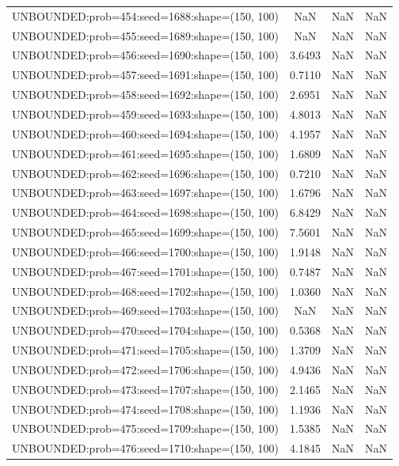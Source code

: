 \begin{longtable}{lccc}
UNBOUNDED:prob=454:seed=1688:shape=(150, 100) &     NaN &   NaN &    NaN \\
UNBOUNDED:prob=455:seed=1689:shape=(150, 100) &     NaN &   NaN &    NaN \\
UNBOUNDED:prob=456:seed=1690:shape=(150, 100) &  3.6493 &   NaN &    NaN \\
UNBOUNDED:prob=457:seed=1691:shape=(150, 100) &  0.7110 &   NaN &    NaN \\
UNBOUNDED:prob=458:seed=1692:shape=(150, 100) &  2.6951 &   NaN &    NaN \\
UNBOUNDED:prob=459:seed=1693:shape=(150, 100) &  4.8013 &   NaN &    NaN \\
UNBOUNDED:prob=460:seed=1694:shape=(150, 100) &  4.1957 &   NaN &    NaN \\
UNBOUNDED:prob=461:seed=1695:shape=(150, 100) &  1.6809 &   NaN &    NaN \\
UNBOUNDED:prob=462:seed=1696:shape=(150, 100) &  0.7210 &   NaN &    NaN \\
UNBOUNDED:prob=463:seed=1697:shape=(150, 100) &  1.6796 &   NaN &    NaN \\
UNBOUNDED:prob=464:seed=1698:shape=(150, 100) &  6.8429 &   NaN &    NaN \\
UNBOUNDED:prob=465:seed=1699:shape=(150, 100) &  7.5601 &   NaN &    NaN \\
UNBOUNDED:prob=466:seed=1700:shape=(150, 100) &  1.9148 &   NaN &    NaN \\
UNBOUNDED:prob=467:seed=1701:shape=(150, 100) &  0.7487 &   NaN &    NaN \\
UNBOUNDED:prob=468:seed=1702:shape=(150, 100) &  1.0360 &   NaN &    NaN \\
UNBOUNDED:prob=469:seed=1703:shape=(150, 100) &     NaN &   NaN &    NaN \\
UNBOUNDED:prob=470:seed=1704:shape=(150, 100) &  0.5368 &   NaN &    NaN \\
UNBOUNDED:prob=471:seed=1705:shape=(150, 100) &  1.3709 &   NaN &    NaN \\
UNBOUNDED:prob=472:seed=1706:shape=(150, 100) &  4.9436 &   NaN &    NaN \\
UNBOUNDED:prob=473:seed=1707:shape=(150, 100) &  2.1465 &   NaN &    NaN \\
UNBOUNDED:prob=474:seed=1708:shape=(150, 100) &  1.1936 &   NaN &    NaN \\
UNBOUNDED:prob=475:seed=1709:shape=(150, 100) &  1.5385 &   NaN &    NaN \\
UNBOUNDED:prob=476:seed=1710:shape=(150, 100) &  4.1845 &   NaN &    NaN \\

\end{longtable}
